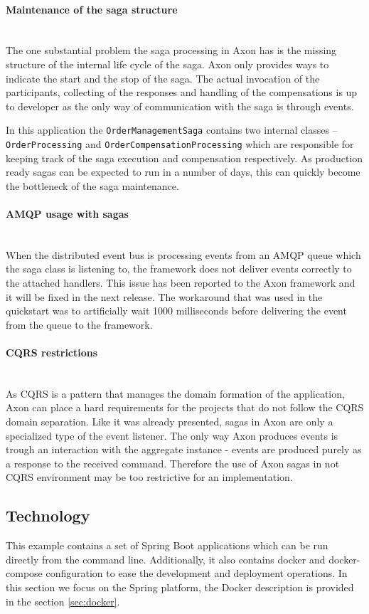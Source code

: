 \documentclass[oneside,
  digital, %
  table,   %
  nolof,     %
  nolot,     %
]{fithesis3}
\newcommand{\newlinepar}[1]{\paragraph{#1}\needspace{4\baselineskip}\mbox{}\\}
\begin{document}
\newlinepar{Maintenance of the saga structure}

The one substantial problem the saga processing in Axon has is the missing structure of the internal life cycle of the saga. Axon only provides ways to indicate the start and the stop of the saga. The actual invocation of the participants, collecting of the responses and handling of the compensations is up to developer as the only way of communication with the saga is through events.

In this application the \texttt{OrderManagementSaga} contains two internal classes -- \texttt{OrderProcessing} and \texttt{OrderCompensationProcessing} which are responsible for keeping track of the saga execution and compensation respectively. As production ready sagas can be expected to run in a number of days, this can quickly become the bottleneck of the saga maintenance.

\newlinepar{AMQP usage with sagas}

When the distributed event bus is processing events from an AMQP queue which the saga class is listening to, the framework does not deliver events correctly to the attached handlers. This issue has been reported to the Axon framework and it will be fixed in the next release. The workaround that was used in the quickstart was to artificially wait 1000 milliseconds before delivering the event from the queue to the framework.

\newlinepar{CQRS restrictions}

As CQRS is a pattern that manages the domain formation of the application, Axon can place a hard requirements for the projects that do not follow the CQRS domain separation. Like it was already presented, sagas in Axon are only a specialized type of the event listener. The only way Axon produces events is trough an interaction with the aggregate instance - events are produced purely as a response to the received command. Therefore the use of Axon sagas in not CQRS environment may be too restrictive for an implementation.

\subsection{Technology}

This example contains a set of Spring Boot applications which can be run directly from the command line. Additionally, it also contains docker and docker-compose configuration to ease the development and deployment operations. In this section we focus on the Spring platform, the Docker description is provided in the section \ref{sec:docker}.
\end{document}
